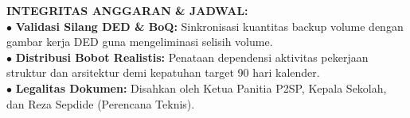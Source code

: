 \documentclass[10pt,a4paper,landscape]{article}
\begin{document}
\begin{minipage}[t]{0.30\linewidth}
  \begin{tcolorbox}[sharp corners, boxrule=0.6pt, colframe=pnavy, colback=pbglight, left=2.5mm, right=2.5mm, top=2mm, bottom=2mm, height=54mm]
    {\fontsize{7pt}{8.5pt}\selectfont\bfseries\color{pnavy}INTEGRITAS ANGGARAN \& JADWAL:}\\[1.5mm]
    {\fontsize{6.5pt}{8.2pt}\selectfont\color{psteel}
    $\bullet$ \textbf{Validasi Silang DED \& BoQ:} Sinkronisasi kuantitas backup volume dengan gambar kerja DED guna mengeliminasi selisih volume.\\
    $\bullet$ \textbf{Distribusi Bobot Realistis:} Penataan dependensi aktivitas pekerjaan struktur dan arsitektur demi kepatuhan target 90 hari kalender.\\
    $\bullet$ \textbf{Legalitas Dokumen:} Disahkan oleh Ketua Panitia P2SP, Kepala Sekolah, dan Reza Sepdide (Perencana Teknis).
    }
  \end{tcolorbox}
\end{minipage}%
\hfill
\end{document}
